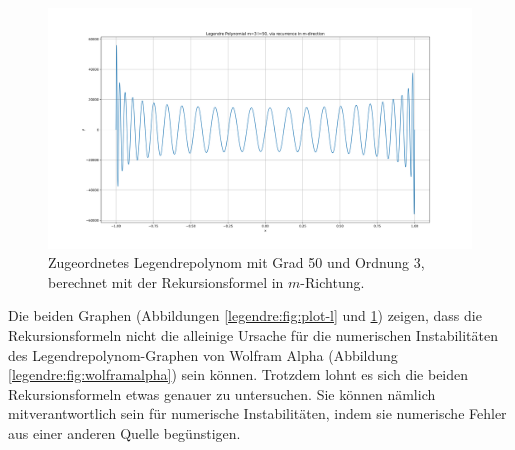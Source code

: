 \begin{figure}[!h]
\centering
\includegraphics[width=1.0\linewidth]{papers/legendre/plots/plot_m}
\caption{Zugeordnetes Legendrepolynom mit Grad 50 und Ordnung 3, berechnet mit der Rekursionsformel in \texorpdfstring{$m$}{m}-Richtung.}
\label{legendre:fig:plot-m}
\end{figure}
Die beiden Graphen (Abbildungen \ref{legendre:fig:plot-l} und \ref{legendre:fig:plot-m}) zeigen, dass die Rekursionsformeln nicht die alleinige Ursache für die numerischen Instabilitäten des Legendrepolynom-Graphen von Wolfram Alpha (Abbildung \ref{legendre:fig:wolframalpha}) sein können.
Trotzdem lohnt es sich die beiden Rekursionsformeln etwas genauer zu untersuchen.
Sie können nämlich mitverantwortlich sein für numerische Instabilitäten, indem sie numerische Fehler aus einer anderen Quelle begünstigen.